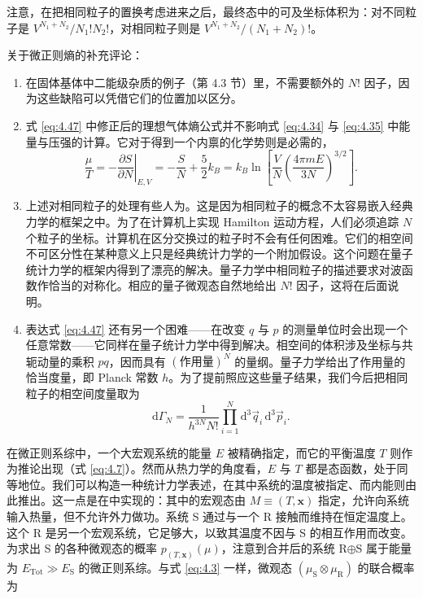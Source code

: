 注意，在把相同粒子的置换考虑进来之后，最终态中的可及坐标体积为：对不同粒子是 $V^{N_1+N_2}/N_1!N_2!$，对相同粒子则是 $V^{N_1+N_2}/(N_1+N_2)!$。

关于微正则熵的补充评论：

\begin{enumerate}[itemsep=0.35em,topsep=0.4em]
  \item 在固体基体中二能级杂质的例子（第 4.3 节）里，不需要额外的 $N!$ 因子，因为这些缺陷可以凭借它们的位置加以区分。

  \item 式 \eqref{eq:4.47} 中修正后的理想气体熵公式并不影响式 \eqref{eq:4.34} 与 \eqref{eq:4.35} 中能量与压强的计算。它对于得到一个内禀的化学势则是必需的，
  \begin{equation}\label{eq:4.50}
    \frac{\mu}{T}=-\left.\frac{\partial S}{\partial N}\right|_{E,V}=-\frac{S}{N}+\frac{5}{2}k_B=k_B\ln\left[\frac{V}{N}\left(\frac{4\pi mE}{3N}\right)^{3/2}\right].
  \end{equation}

  \item 上述对相同粒子的处理有些人为。这是因为相同粒子的概念不太容易嵌入经典力学的框架之中。为了在计算机上实现 Hamilton 运动方程，人们必须追踪 $N$ 个粒子的坐标。计算机在区分交换过的粒子时不会有任何困难。它们的相空间不可区分性在某种意义上只是经典统计力学的一个附加假设。这个问题在量子统计力学的框架内得到了漂亮的解决。量子力学中相同粒子的描述要求对波函数作恰当的对称化。相应的量子微观态自然地给出 $N!$ 因子，这将在后面说明。

  \item 表达式 \eqref{eq:4.47} 还有另一个困难——在改变 $q$ 与 $p$ 的测量单位时会出现一个任意常数——它同样在量子统计力学中得到解决。相空间的体积涉及坐标与共轭动量的乘积 $pq$，因而具有 $(\text{作用量})^N$ 的量纲。量子力学给出了作用量的恰当度量，即 Planck 常数 $h$。为了提前照应这些量子结果，我们今后把相同粒子的相空间度量取为
  \begin{equation}\label{eq:4.51}
    \mathrm{d}\Gamma_N=\frac{1}{h^{3N}N!}\prod_{i=1}^N\mathrm{d}^3\vec q_i\,\mathrm{d}^3\vec p_i.
  \end{equation}
\end{enumerate}


在微正则系综中，一个大宏观系统的能量 $E$ 被精确指定，而它的平衡温度 $T$ 则作为推论出现（式 \eqref{eq:4.7}）。然而从热力学的角度看，$E$ 与 $T$ 都是态函数，处于同等地位。我们可以构造一种统计力学表述，在其中系统的温度被指定、而内能则由此推出。这一点是在中实现的：其中的宏观态由 $M\equiv(T,\mathbf x)$ 指定，允许向系统输入热量，但不允许外力做功。系统 S 通过与一个 R 接触而维持在恒定温度上。这个 R 是另一个宏观系统，它足够大，以致其温度不因与 S 的相互作用而改变。为求出 S 的各种微观态的概率 $p_{(T,\mathbf x)}(\mu)$，注意到合并后的系统 R$\oplus$S 属于能量为 $E_{\text{Tot}}\gg E_{\text{S}}$ 的微正则系综。与式 \eqref{eq:4.3} 一样，微观态 $(\mu_{\text{S}}\otimes\mu_{\text{R}})$ 的联合概率为

